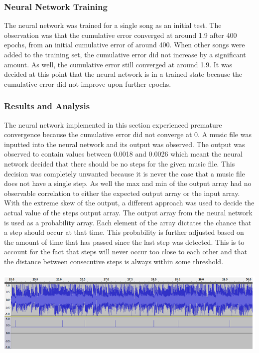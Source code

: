 \subsubsection{Neural Network Training}
The neural network was trained for a single song as an initial test. The observation was that the cumulative error converged at around 1.9 after 400 epochs, from an initial cumulative error of around 400. When other songs were added to the training set, the cumulative error did not increase by a significant amount. As well, the cumulative error still converged at around 1.9. It was decided at this point that the neural network is in a trained state because the cumulative error did not improve upon further epochs. \\

\subsubsection{Results and Analysis}
The neural network implemented in this section experienced premature convergence because the cumulative error did not converge at 0. A music file was inputted into the neural network and its output was observed. The output was observed to contain values between 0.0018 and 0.0026 which meant the neural network decided that there should be no steps for the given music file. This decision was completely unwanted because it is never the case that a music file does not have a single step. As well the max and min of the output array had no observable correlation to either the expected output array or the input array.\\

With the extreme skew of the output, a different approach was used to decide the actual value of the steps output array. The output array from the neural network is used as a probability array. Each element of the array dictates the chance that a step should occur at that time. This probability is further adjusted based on the amount of time that has passed since the last step was detected. This is to account for the fact that steps will never occur too close to each other and that the distance between consecutive steps is always within some threshold.\\\\

\includegraphics[scale=0.55]{signal_2.png}

